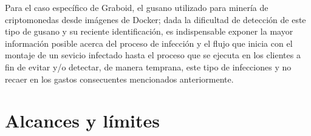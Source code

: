 \documentclass[../main/main.tex]{subfiles}
\begin{document}
  Para el caso específico de Graboid, el gusano utilizado para minería de criptomonedas desde imágenes de Docker; dada la dificultad de detección de este tipo de gusano y su reciente identificación, es indispensable exponer la mayor información posible acerca del proceso de infección y el flujo que inicia con el montaje de un sevicio infectado hasta el proceso que se ejecuta en los clientes a fin de evitar y/o detectar, de manera temprana, este tipo de infecciones y no recaer en los gastos consecuentes mencionados anteriormente.

  \section{Alcances y límites}

  
\end{document}

